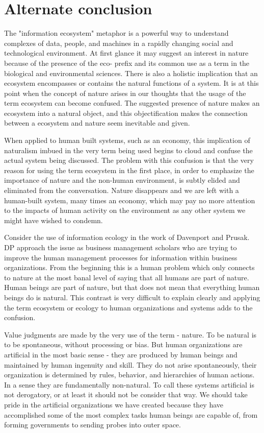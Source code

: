 \section{Alternate conclusion}

The "information ecosystem" metaphor is a powerful way to understand complexes of data, people, and machines in a rapidly changing social and technological environment. At first glance it may suggest an interest in nature because of the presence of the eco- prefix and its common use as a term in the biological and environmental sciences. There is also a holistic implication that an ecosystem encompasses or contains the natural functions of a system. It is at this point when the concept of nature arises in our thoughts that the usage of the term ecosystem can become confused. The suggested presence of nature makes an ecosystem into a natural object, and this objectification makes the connection between a ecosystem and nature seem inevitable and given. 

When applied to human built systems, such as an economy, this implication of naturalism imbued in the very term being used begins to cloud and confuse the actual system being discussed. The problem with this confusion is that the very reason for using the term ecosystem in the first place, in order to emphasize the importance of nature and the non-human environment, is subtly elided and eliminated from the conversation. Nature disappears and we are left with  a human-built system, many times an economy, which may pay no more attention to the impacts of human activity on the environment as any other system we might have wished to condemn.

Consider the use of information ecology in the work of Davenport and Prusak. DP approach the issue as business management scholars who are trying to improve the human management processes for information within business organizations. From the beginning this is a human problem which only connects to nature at the most banal level of saying that all humans are part of nature. Human beings are part of nature, but that does not mean that everything human beings do is natural. This contrast is very difficult to explain clearly and applying the term ecosystem or ecology to human organizations and systems adds to the confusion.

Value judgments are made by the very use of the term - nature. To be natural is to be spontaneous, without processing or bias. But human organizations are artificial in the most basic sense - they are produced by human beings and maintained by human ingenuity and skill. They do not arise spontaneously, their organization is determined by rules, behavior, and hierarchies of human actions. In a sense they are fundamentally non-natural. To call these systems artificial is not derogatory, or at least it should not be consider that way. We should take pride in the artificial organizations we have created because they have accomplished some of the most complex tasks human beings are capable of, from forming governments to sending probes into outer space.


